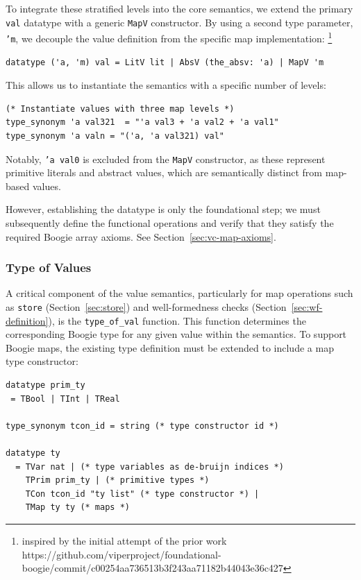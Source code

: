 \documentclass[11pt]{article}
\begin{document}
To integrate these stratified levels into the core semantics,
we extend the primary \texttt{val} datatype with a generic \texttt{MapV} constructor.
By using a second type parameter, \texttt{'m}, we decouple the value definition from the specific map implementation:
\footnote{inspired by the initial attempt of the prior work
https://github.com/viperproject/foundational-boogie/commit/c00254aa736513b3f243aa71182b44043e36c427}


\begin{verbatim}
datatype ('a, 'm) val = LitV lit | AbsV (the_absv: 'a) | MapV 'm
\end{verbatim}

This allows us to instantiate the semantics with a specific number of levels:

\begin{verbatim}
(* Instantiate values with three map levels *)
type_synonym 'a val321  = "'a val3 + 'a val2 + 'a val1"
type_synonym 'a valn = "('a, 'a val321) val"
\end{verbatim}

Notably, \texttt{'a val0} is excluded from the \texttt{MapV} constructor,
as these represent primitive literals and abstract values, which are semantically distinct from map-based values.

However, establishing the datatype is only the foundational step;
we must subsequently define the functional operations and verify that they satisfy the required Boogie array axioms.
See Section~\ref{sec:vc-map-axioms}.

\subsubsection{Type of Values}
\label{sec:type-of-values}
A critical component of the value semantics, particularly for map operations such as \texttt{store} (Section~\ref{sec:store}) and well-formedness checks (Section~\ref{sec:wf-definition}),
is the \texttt{type\_of\_val} function.
This function determines the corresponding Boogie type for any given value within the semantics.
To support Boogie maps, the existing type definition must be extended to include a map type constructor:

\begin{verbatim}
datatype prim_ty
 = TBool | TInt | TReal

type_synonym tcon_id = string (* type constructor id *)

datatype ty
  = TVar nat | (* type variables as de-bruijn indices *)
    TPrim prim_ty | (* primitive types *)
    TCon tcon_id "ty list" (* type constructor *) |
    TMap ty ty (* maps *)
\end{verbatim}
\end{document}
